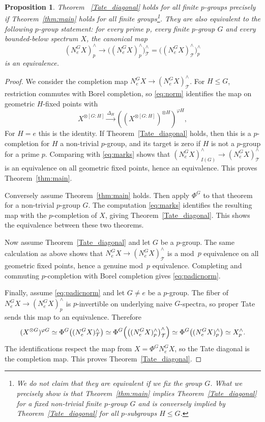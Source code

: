 \documentclass[11pt,a4paper]{article}
\newtheorem{prop}[thm]{Proposition}
\theoremstyle{definition}
\newcommand{\Tt}{\mathcal T}
\newcommand{\NormG}{N_e^G}
\begin{document}
\begin{prop}\label{prop:equivalent}Theorem ~\ref{Tate_diagonal} holds for all finite $p$-groups precisely if Theorem~\ref{thm:main} holds for all finite groups\footnote{We do not claim that they are equivalent if we fix the group $G$. What we precisely show is that Theorem~\ref{thm:main} implies  Theorem~\ref{Tate_diagonal} for a fixed non-trivial finite $p$-group $G$ and is conversely implied by Theorem~\ref{Tate_diagonal} for all $p$-subgroups $H \le G$.  }.
 They are
also equivalent to the following $p$-group statement: for every prime $p$,
every finite $p$-group $G$ and every bounded-below spectrum $X$, the canonical map
\begin{equation}\label{eq:padicnorm}
 (\NormG X)^\wedge_p\longrightarrow
 \bigl((\NormG X)^\wedge_p\bigr)^\wedge_{\Tt} =  \bigl((\NormG X)^\wedge_{\Tt}\bigr)^\wedge_{p} 
\end{equation}
is an equivalence.
\end{prop}
\begin{proof}
We consider the  completion map $\NormG X\to (\NormG X)^\wedge_{\Tt}$.
For $H\le G$, restriction commutes with Borel completion, so \eqref{eq:norm}
identifies the map on geometric $H$-fixed points with
\[
 X^{\otimes[G:H]}\xrightarrow{\Delta_H}((X^{\otimes[G:H]})^{\otimes H})^{\varphi H},
\]
For $H=e$ this is the identity. If Theorem~\ref{Tate_diagonal} holds, then this is a
$p$-completion for $H$ a non-trivial $p$-group, and its target is zero
if $H$ is not a $p$-group for a prime $p$. Comparing with \eqref{eq:marks} shows
that $(\NormG X)^\wedge_{I(G)}\to (\NormG X)^\wedge_{\Tt}$ is an equivalence on all geometric
fixed points, hence an equivalence. This proves Theorem~\ref{thm:main}.

Conversely assume Theorem~\ref{thm:main} holds. Then apply $\Phi^G$ to that theorem for a non-trivial $p$-group $G$. The computation
\eqref{eq:marks} identifies the resulting map with the $p$-completion of
$X$, giving Theorem~\ref{Tate_diagonal}. This shows the equivalence between these two theorems. 

Now assume Theorem~\ref{Tate_diagonal} and let $G$ be a $p$-group.
The same calculation as above  shows that $\NormG X\to (\NormG X)^\wedge_{\Tt}$ is a mod~$p$
equivalence on all geometric fixed points, hence a genuine mod~$p$
equivalence. Completing and commuting $p$-completion with Borel completion
gives \eqref{eq:padicnorm}.

Finally, assume \eqref{eq:padicnorm} and let $G\ne e$ be a $p$-group.
The fiber of $\NormG X\to (\NormG X)^\wedge_p$ is $p$-invertible on underlying naive
$G$-spectra, so proper Tate sends this map to an equivalence. Therefore
\[
 \begin{aligned}
 (X^{\otimes G})^{\varphi G}
 \simeq\Phi^G\bigl((\NormG X)^\wedge_{\Tt}\bigr) 
 \simeq\Phi^G\Bigl(\bigl((\NormG X)^\wedge_p\bigr)^\wedge_{\Tt}\Bigr) 
 \simeq\Phi^G\bigl((\NormG X)^\wedge_p\bigr)\simeq X^\wedge_p.
 \end{aligned}
\]
The identifications respect the map from $X=\Phi^G\NormG X$, so the Tate diagonal
is the completion map. This proves Theorem~\ref{Tate_diagonal}.
\end{proof}
\end{document}
